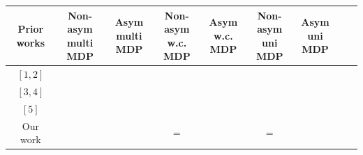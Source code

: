\documentclass{article} %
\newcommand{\cmark}{\ding{51}}%
\newcommand{\xmark}{\ding{55}}%
\begin{document}
\begin{table}[h]
    \centering
 \begin{tabular}{ |c|c|c|c|c|c|c|c|c| } 
 \hline
 Prior works & \makecell{Non-asym \\ multi MDP}& \makecell{Asym \\ multi MDP}&  \makecell{Non-asym \\ w.c. MDP}& \makecell{Asym \\ w.c. MDP} &
  \makecell{Non-asym  \\ uni MDP}& \makecell{Asym  \\ uni MDP}  \\
  \hline   
  $[1,2] $ & \xmark & \xmark & \xmark & \xmark & \cmark &  \cmark \\
    $[3,4]$  & \xmark & \cmark & \xmark & \cmark & \cmark &  \cmark \\
    $[5]$ & \xmark & \xmark & \xmark & \xmark & \cmark &  \cmark \\
  \hline
  Our work &  \cmark\hspace{0.1cm}{\footnotesize$>$}\hspace{0.1cm}\cmark & \cmark & \cmark $=$ \cmark  & \cmark&  \textcolor{black}{\cmark} $=$ \textcolor{black}{\cmark}  &  \cmark \\

\end{tabular}
\end{table}
\end{document}
